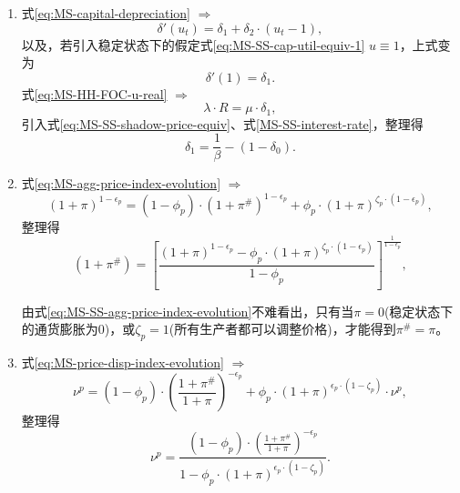 \begin{enumerate}
\item 式\eqref{eq:MS-capital-depreciation} $\Rightarrow$
\begin{equation}
\label{eq:MS-SS-dep-rate-derivative}
\delta'(u_t) = \delta_1 + \delta_2 \cdot \left(u_t - 1 \right),
\end{equation}
以及，若引入稳定状态下的假定式\eqref{eq:MS-SS-cap-util-equiv-1} $u \equiv 1$，上式变为
\begin{equation}
\label{eq:MS-SS-dep-rate-derivative-u-1}
\delta'(1) = \delta_1.
\end{equation}
式\eqref{eq:MS-HH-FOC-u-real} $\Rightarrow$
\begin{equation*}
\lambda \cdot R  = \mu \cdot \delta_1,
\end{equation*}
引入式\eqref{eq:MS-SS-shadow-price-equiv}、式\eqref{MS-SS-interest-rate}，整理得
\begin{equation}
\label{eq:MS-SS-delta-1}
\delta_1 = \frac{1}{\beta} - \left(1 - \delta_0 \right).
\end{equation}

\item 式\eqref{eq:MS-agg-price-index-evolution} $\Rightarrow$
\begin{equation*}
\left(1+\pi \right)^{1-\epsilon_p} = \left( 1 - \phi_p \right) \cdot \left( 1 + \pi^{\#} \right)^{1-\epsilon_p} + \phi_p \cdot \left(1+\pi \right)^{\zeta_p \cdot \left( 1 - \epsilon_p \right)},
\end{equation*}
整理得
\begin{equation}
\label{eq:MS-SS-agg-price-index-evolution}
\left(1+\pi^{\#}\right) = \left[
\frac{
  \left(1+\pi\right)^{1-\epsilon_p} - \phi_p \cdot \left(1+\pi\right)^{\zeta_p \cdot \left(1-\epsilon_p\right)}
}{
  1-\phi_p
}
\right] ^{\frac{1}{1-\epsilon_p}},
\end{equation}

由式\eqref{eq:MS-SS-agg-price-index-evolution}不难看出，只有当$\pi = 0$(稳定状态下的通货膨胀为$0$)，或$\zeta_p = 1$(所有生产者都可以调整价格)，才能得到$\pi^{\#} = \pi$。

\item 式\eqref{eq:MS-price-disp-index-evolution} $\Rightarrow$
\begin{equation*}
\nu^p = \left( 1 - \phi_p \right) \cdot \left(\frac{1+\pi^{\#}}{1+\pi}\right)^{-\epsilon_p} + \phi_p \cdot \left( 1 + \pi \right)^{\epsilon_p \cdot \left( 1 - \zeta_p \right)} \cdot \nu^p,
\end{equation*}
整理得
\begin{equation}
\label{eq:MS-SS-price-disp-evo}
\nu^p = \frac{
  \left(1-\phi_p \right) \cdot \left(\frac{1+\pi^{\#}}{1+\pi}\right)^{-\epsilon_p}
}{
  1 - \phi_p \cdot \left( 1 + \pi \right)^{\epsilon_p \cdot \left( 1 - \zeta_p \right)}
}.
\end{equation}


\end{enumerate}
